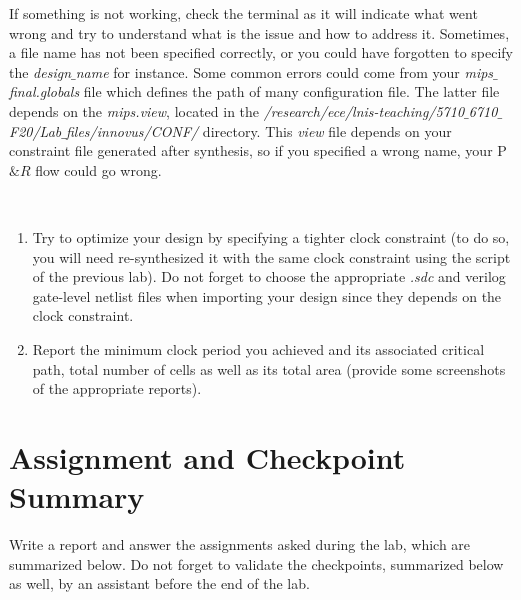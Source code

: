 If something is not working, check the terminal as it will indicate what went wrong and try to understand what is the issue and how to address it. Sometimes, a file name has not been specified correctly, or you could have forgotten to specify the \textit{design$\_$name} for instance. Some common errors could come from your \textit{mips$\_$final.globals} file which defines the path of many configuration file. The latter file depends on the \textit{mips.view}, located in the \textit{/research/ece/lnis-teaching/5710$\_$6710$\_$F20/Lab$\_$files/innovus/CONF/} directory. This \textit{view} file depends on your constraint file generated after synthesis, so if you specified a wrong name, your P$\&R$ flow could go wrong.

	\begin{exercise}\
	\vspace{-6mm}
	\begin{enumerate}
		\item Try to optimize your design by specifying a tighter clock constraint (to do so, you will need re-synthesized it with the same clock constraint using the script of the previous lab). Do not forget to choose the appropriate \textit{.sdc} and verilog gate-level netlist files when importing your design since they depends on the clock constraint.
\item Report the minimum clock period you achieved and its associated critical path, total number of cells as well as its total area (provide some screenshots of the appropriate reports).
	\end{enumerate}
	\vspace{-5mm}
\end{exercise}


\section{Assignment and Checkpoint Summary}
Write a report and answer the assignments asked during the lab, which are summarized below. Do not forget to validate the checkpoints, summarized below as well, by an assistant before the end of the lab.

